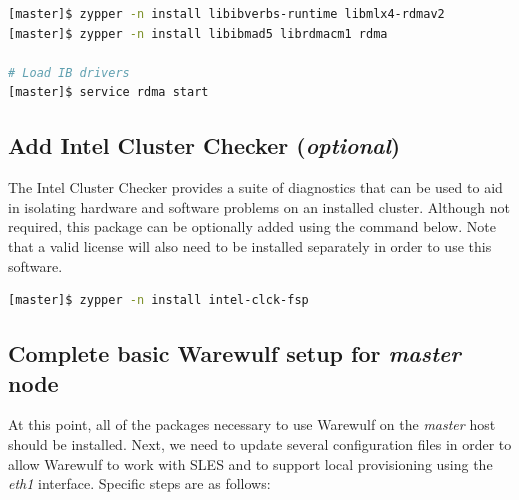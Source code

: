 \documentclass[letterpaper]{article}
\begin{document}
\begin{lstlisting}[language=bash,keywords={}]
[master]$ zypper -n install libibverbs-runtime libmlx4-rdmav2
[master]$ zypper -n install libibmad5 librdmacm1 rdma

# Load IB drivers
[master]$ service rdma start
\end{lstlisting}

\subsection{Add Intel Cluster Checker ({\em optional})} \label{sec:add_clck}

The Intel Cluster Checker provides a suite of diagnostics that can be used to
aid in isolating hardware and software problems on an installed
cluster. Although not required, this package can be optionally added using the
command below. Note that a valid license will also need to be installed
separately in order to use this software.

\begin{lstlisting}[language=bash,keywords={}]
[master]$ zypper -n install intel-clck-fsp
\end{lstlisting}


\subsection{Complete basic Warewulf setup for {\em master} node}

At this point, all of the packages necessary to use Warewulf on the {\em
  master} host should be installed.  Next, we need to update several
configuration files in order to allow Warewulf to work with SLES and to support
local provisioning using the {\em eth1} interface.  Specific steps are as
follows:

\end{document}
